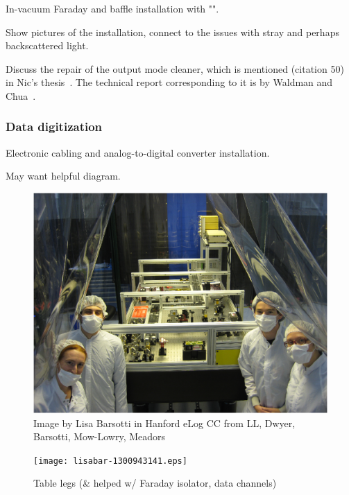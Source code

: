                 In-vacuum Faraday and baffle installation with "".

                Show pictures of the installation, connect to the issues with stray and perhaps backscattered light.

		Discuss the repair of the output mode cleaner, which is mentioned (citation 50) in Nic's thesis~\cite{SmithThesis}. The technical report corresponding to it is by Waldman and Chua~\cite{Waldman2011}.

            \subsubsection{Data digitization}
            \label{data_digitization}

                Electronic cabling and analog-to-digital converter installation.

		May want helpful diagram.






\begin{figure}
\includegraphics[width=0.6\paperwidth]{lisabar-1289966130.eps}




\caption{Image by Lisa Barsotti in Hanford eLog
\newline CC from LL, Dwyer, Barsotti, Mow-Lowry, Meadors
}
\end{figure}
\begin{figure}
\texttt{[image: lisabar-1300943141.eps]}
\caption{Table legs (\& helped w/ Faraday isolator, data channels)
}
\end{figure}


